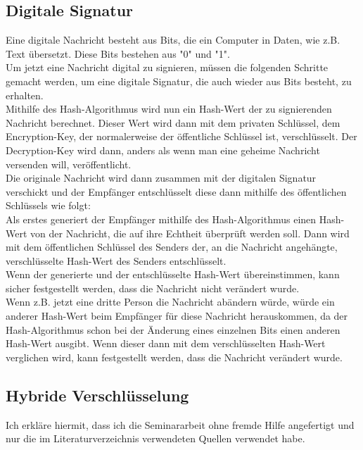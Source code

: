 \documentclass[12pt,a4paper]{scrartcl}
\begin{document}
	\subsection{Digitale Signatur}
	Eine digitale Nachricht besteht aus Bits, die ein Computer in Daten, wie z.B. Text übersetzt. Diese Bits bestehen aus "0" und "1". \\ 
	Um jetzt eine Nachricht digital zu signieren, müssen die folgenden Schritte gemacht werden, um eine digitale Signatur, die auch wieder aus Bits besteht, zu erhalten.\\
	Mithilfe des Hash-Algorithmus wird nun ein Hash-Wert der zu signierenden Nachricht berechnet. Dieser Wert wird dann mit dem privaten Schlüssel, dem Encryption-Key, der normalerweise der öffentliche Schlüssel ist, verschlüsselt. %
	Der Decryption-Key wird dann, anders als wenn man eine geheime Nachricht versenden will, veröffentlicht.\\
	Die originale Nachricht wird dann zusammen mit der digitalen Signatur verschickt und der Empfänger entschlüsselt diese dann mithilfe des öffentlichen Schlüssels wie folgt:\\
	Als erstes generiert der Empfänger mithilfe des Hash-Algorithmus einen Hash-Wert von der Nachricht, die auf ihre Echtheit überprüft werden soll. Dann wird mit dem öffentlichen Schlüssel des Senders der, an die Nachricht angehängte, verschlüsselte Hash-Wert des Senders entschlüsselt. \\
Wenn der generierte und der entschlüsselte Hash-Wert übereinstimmen, kann sicher festgestellt werden, dass die Nachricht nicht verändert wurde. \\
Wenn z.B. jetzt eine dritte Person die Nachricht abändern würde, würde ein anderer Hash-Wert beim Empfänger für diese Nachricht herauskommen, da der Hash-Algorithmus schon bei der Änderung eines einzelnen Bits einen anderen Hash-Wert ausgibt. Wenn dieser dann mit dem verschlüsselten Hash-Wert verglichen wird, kann festgestellt werden, dass die Nachricht verändert wurde.
	
	

	 	
	\subsection{Hybride Verschlüsselung}

\pagebreak
\listoffigures
\printbibliography
\pagebreak

\begin{flushleft}
Ich erkläre hiermit, dass ich die Seminararbeit ohne fremde Hilfe angefertigt und nur die im Literaturverzeichnis verwendeten Quellen verwendet habe.
\end{flushleft}
\end{document}
